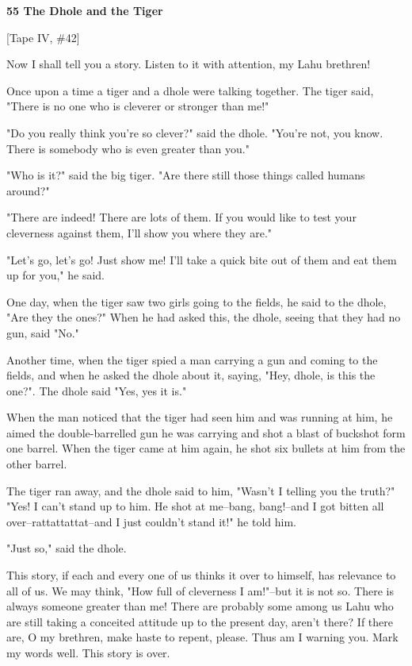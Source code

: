 
\textbf{55 The Dhole and the Tiger}

[Tape IV, \#42]

Now I shall tell you a story. Listen to it with attention, my Lahu brethren!

Once upon a time a tiger and a dhole were talking together. The tiger said, "There
is no one who is cleverer or stronger than me!"

"Do you really think you're so clever?" said the dhole. "You're
not, you know. There is somebody who is even greater than you."

"Who is it?" said the big tiger. "Are there still those
things called humans around?"

"There are indeed! There are lots of them. If you would like to test your
cleverness against them, I'll show you where they are."

"Let's go, let's go! Just show me! I'll take a quick bite out of them
and eat them up for you," he said.

One day, when the tiger saw two girls going to the fields, he said to the dhole,
"Are they the ones?" When he had asked this, the dhole, seeing
that they had no gun, said "No."

Another time, when the tiger spied a man carrying a gun and coming to the fields,
and when he asked the dhole about it, saying, "Hey, dhole, is this the
one?". The dhole said "Yes, yes it is."

When the man noticed that the tiger had seen him and was running at him, he aimed
the double-barrelled gun he was carrying and shot a blast of buckshot form one
barrel. When the tiger came at him again, he shot six bullets at him from the other
barrel.

The tiger ran away, and the dhole said to him, "Wasn't I telling you the
truth?" "Yes! I can't stand up to him. He shot at me--bang, bang!--and
I got bitten all over--rattattattat--and I just couldn't stand it!" he
told him.

"Just so," said the dhole.

This story, if each and every one of us thinks it over to himself, has relevance
to all of us. We may think, "How full of cleverness I am!"--but
it is not so. There is always someone greater than me! There are probably some
among us Lahu who are still taking a conceited attitude up to the present day,
aren't there? If there are, O my brethren, make haste to repent, please. Thus am
I warning you. Mark my words well. This story is over.


